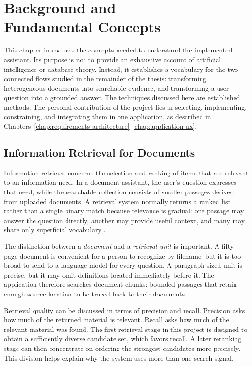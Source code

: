 \chapter[Background and Fundamental Concepts]{Background and\\Fundamental Concepts}
\label{chap:background}

This chapter introduces the concepts needed to understand the implemented assistant. Its purpose is not to provide an exhaustive account of artificial intelligence or database theory. Instead, it establishes a vocabulary for the two connected flows studied in the remainder of the thesis: transforming heterogeneous documents into searchable evidence, and transforming a user question into a grounded answer. The techniques discussed here are established methods. The personal contribution of the project lies in selecting, implementing, constraining, and integrating them in one application, as described in Chapters~\ref{chap:requirements-architecture}--\ref{chap:application-ux}.

\section{Information Retrieval for Documents}
\label{sec:background-ir}

Information retrieval concerns the selection and ranking of items that are relevant to an information need. In a document assistant, the user's question expresses that need, while the searchable collection consists of smaller passages derived from uploaded documents. A retrieval system normally returns a ranked list rather than a single binary match because relevance is gradual: one passage may answer the question directly, another may provide useful context, and many may share only superficial vocabulary \cite{Manning2008IR}.

The distinction between a \emph{document} and a \emph{retrieval unit} is important. A fifty-page document is convenient for a person to recognize by filename, but it is too broad to send to a language model for every question. A paragraph-sized unit is precise, but it may omit definitions located immediately before it. The application therefore searches document chunks: bounded passages that retain enough source location to be traced back to their documents.

Retrieval quality can be discussed in terms of precision and recall. Precision asks how much of the returned material is relevant. Recall asks how much of the relevant material was found. The first retrieval stage in this project is designed to obtain a sufficiently diverse candidate set, which favors recall. A later reranking stage can then concentrate on ordering the strongest candidates more precisely. This division helps explain why the system uses more than one search signal.

